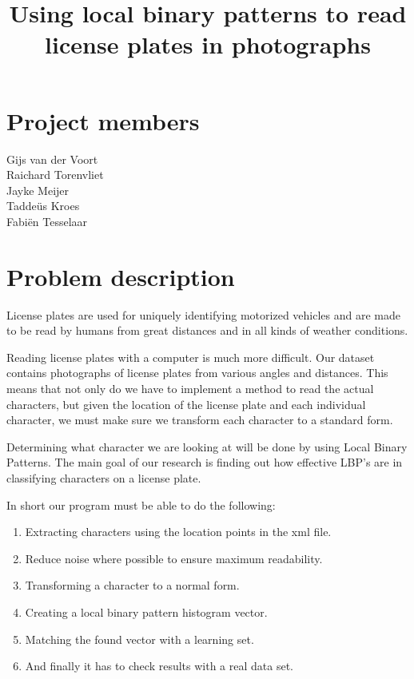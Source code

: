 \documentclass[a4paper]{article}
\title{Using local binary patterns to read license plates in photographs}
\begin{document}
\maketitle

\section*{Project members}
Gijs van der Voort\\
Raichard Torenvliet\\
Jayke Meijer\\
Tadde\"us Kroes\\
Fabi\"en Tesselaar

\tableofcontents
\pagebreak

\setcounter{secnumdepth}{1}

\section{Problem description}

License plates are used for uniquely identifying motorized vehicles and are
made to be read by humans from great distances and in all kinds of weather
conditions.

Reading license plates with a computer is much more difficult. Our dataset
contains photographs of license plates from various angles and distances. This
means that not only do we have to implement a method to read the actual
characters, but given the location of the license plate and each individual
character, we must make sure we transform each character to a standard form.

Determining what character we are looking at will be done by using Local Binary
Patterns. The main goal of our research is finding out how effective LBP's are
in classifying characters on a license plate.

In short our program must be able to do the following:

\begin{enumerate}
    \item Extracting characters using the location points in the xml file.
    \item Reduce noise where possible to ensure maximum readability.
    \item Transforming a character to a normal form.
    \item Creating a local binary pattern histogram vector.
    \item Matching the found vector with a learning set.
    \item And finally it has to check results with a real data set.
\end{enumerate}
\end{document}
